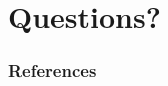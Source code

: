 \documentclass[12pt]{beamer}
\begin{document}

\section*{Questions?}

\begin{frame}[plain]
        \tiny
        \frametitle{References}
        
        \color{black}
        
\end{frame}

\end{document}
